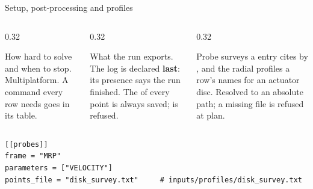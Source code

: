 \begin{frame}[fragile]{Setup, post-processing and profiles}
\begin{columns}[T]
\begin{column}{0.32\textwidth}
\begin{block}{}
\small How hard to solve and when to stop. Multiplatform. A command every row
needs goes in its \code{[[raw]]} table.
\end{block}
\end{column}
\begin{column}{0.32\textwidth}
\begin{block}{}
\small What the run exports. The log is declared \textbf{last}: its presence
says the run finished. The  of every point is always saved;
 is refused.
\end{block}
\end{column}
\begin{column}{0.32\textwidth}
\begin{block}{}
\small Probe surveys a \code{[[probes]]} entry cites by , and
the radial profiles a row's  names for an actuator disc.
Resolved to an absolute path; a missing file is refused at plan.
\end{block}
\end{column}
\end{columns}
\begin{lstlisting}[style=ftsbase]
[[probes]]
frame = "MRP"
parameters = ["VELOCITY"]
points_file = "disk_survey.txt"     # inputs/profiles/disk_survey.txt
\end{lstlisting}
\end{frame}

